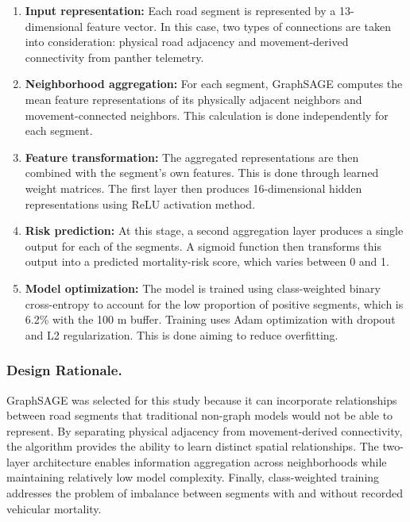 \documentclass[letterpaper]{article}
\begin{document}
\begin{enumerate}
    \item \textbf{Input representation:} Each road segment is represented by a 13-dimensional feature vector. In this case, two types of connections are taken into consideration: physical road adjacency and movement-derived connectivity from panther telemetry.

    \item \textbf{Neighborhood aggregation:} For each segment, GraphSAGE computes the mean feature representations of its physically adjacent neighbors and movement-connected neighbors. This calculation is done independently for each segment.

    \item \textbf{Feature transformation:} The aggregated representations are then combined with the segment's own features. This is done through learned weight matrices. The first layer then produces 16-dimensional hidden representations using ReLU activation method.

    \item \textbf{Risk prediction:} At this stage, a second aggregation layer produces a single output for each of the segments. A sigmoid function then transforms this output into a predicted mortality-risk score, which varies between 0 and 1.

    \item \textbf{Model optimization:} The model is trained using class-weighted binary cross-entropy to account for the low proportion of positive segments, which is 6.2\% with the 100 m buffer. Training uses Adam optimization with dropout and L2 regularization. This is done aiming to reduce overfitting.
\end{enumerate}

\subsubsection{Design Rationale.} GraphSAGE was selected for this study because it can incorporate relationships between road segments that traditional non-graph models would not be able to represent. By separating physical adjacency from movement-derived connectivity, the algorithm provides the ability to learn distinct spatial relationships. The two-layer architecture enables information aggregation across neighborhoods while maintaining relatively low model complexity. Finally, class-weighted training addresses the problem of imbalance between segments with and without recorded vehicular mortality.
\end{document}
